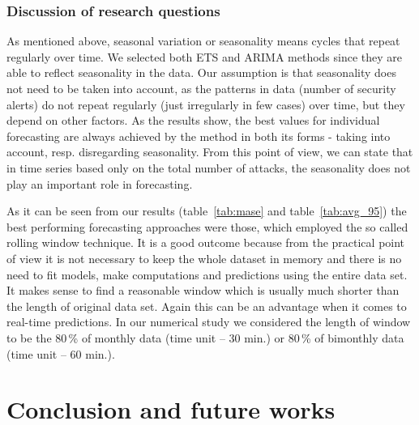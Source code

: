 \documentclass[runningheads]{llncs}
\begin{document}

\subsubsection{Discussion of research questions}

As mentioned above, seasonal variation or seasonality means cycles that repeat regularly over time. We selected both ETS and ARIMA methods since they are able to reflect seasonality in the data. Our assumption is that seasonality does not need to be taken into account, as the patterns in  data (number of security alerts) do not repeat regularly (just irregularly in few cases) over time, but they depend on other factors. As the results show, the best values for individual forecasting are always achieved by the method in both its forms - taking into account, resp. disregarding seasonality. From this point of view, we can state that in time series based only on the total number of attacks, the seasonality does not play an important role in forecasting. 

As it can be seen from our results (table~\ref{tab:mase} and table~\ref{tab:avg_95}) the best performing forecasting approaches were those, which employed the so called rolling window technique. It is a good outcome because from the practical point of view it is not necessary to keep the whole dataset in memory and there is no need to fit models, make computations and predictions using the entire data set. It makes sense to find a reasonable window which is usually much shorter than the length of original data set. Again this can be an advantage when it comes to real-time predictions. In our numerical study we considered the length of window to be the 80\,\% of monthly data (time unit -- 30 min.) or 80\,\% of bimonthly data (time unit -- 60 min.). 

\section{Conclusion and future works}
\end{document}
